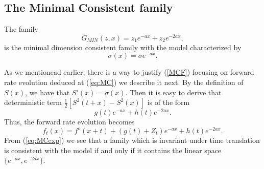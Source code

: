 
\subsection{The Minimal Consistent family}
\begin{propos} The family
\begin{equation}
\label{MCF}
G_{MIN}(z,x)=z_1 e^{-a x}+z_2 e^{-2 a x},
\end{equation}
is the minimal dimension consistent family with the model
characterized by $$\sigma(x)=\sigma e^{-a x}.$$
\end{propos}

\begin{demo}
As we mentionead earlier, there is a way to justify (\ref{MCF})
focusing on forward rate evolution deduced at (\ref{eq:MC}) we
describe it next. By the definition of $S(x)$, we have that
$S'(x)=\sigma(x).$ Then it is easy to derive that deterministic term  
$\frac{1}{2}\left[S^2(t+x)-S^2(x)\right]$ is of the form
$$
g(t)e^{-a x}+h(t) e^{-2 a x}.
$$ 
Thus, the forward rate evolution becomes
\begin{equation}
\label{eq:MCexp}
f_t(x) =f^o(x+t)+\left( g(t)+Z_t \right) e^{-a x}+h(t)e^{-2 a x}.
\end{equation}
From (\ref{eq:MCexp}) we see that a family which is invariant under time translation is
consistent with the model if and only if it contains the linear space
$\{e^{-ax},e^{-2ax}\}$. 
\end{demo} 

